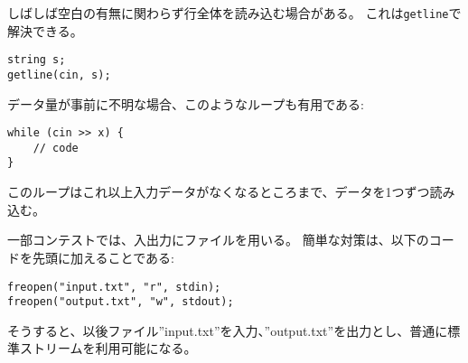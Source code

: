 \begin{comment}
Sometimes the program should read a whole line
from the input, possibly containing spaces.
This can be accomplished by using the
\texttt{getline} function:
\end{comment}

しばしば空白の有無に関わらず行全体を読み込む場合がある。
これは\texttt{getline}で解決できる。

\begin{lstlisting}
string s;
getline(cin, s);
\end{lstlisting}

\begin{comment}
If the amount of data is unknown, the following
loop is useful:
\end{comment}

データ量が事前に不明な場合、このようなループも有用である:

\begin{lstlisting}
while (cin >> x) {
    // code
}
\end{lstlisting}

\begin{comment}
This loop reads elements from the input
one after another, until there is no
more data available in the input.
\end{comment}

このループはこれ以上入力データがなくなるところまで、データを1つずつ読み込む。

\begin{comment}
In some contest systems, files are used for
input and output.
An easy solution for this is to write
the code as usual using standard streams,
but add the following lines to the beginning of the code:
\end{comment}

一部コンテストでは、入出力にファイルを用いる。
簡単な対策は、以下のコードを先頭に加えることである:

\begin{lstlisting}
freopen("input.txt", "r", stdin);
freopen("output.txt", "w", stdout);
\end{lstlisting}

\begin{comment}
After this, the program reads the input from the file
''input.txt'' and writes the output to the file
''output.txt''.
\end{comment}

そうすると、以後ファイル''input.txt''を入力、''output.txt''を出力とし、普通に標準ストリームを利用可能になる。


